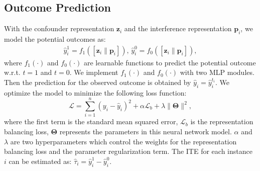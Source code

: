 \subsection{Outcome Prediction}
With the confounder representation $\mathbf{z}_i$ and the interference representation $\mathbf{p}_i$, we model the potential outcomes as:
\begin{align}
\hat{y}^1_i = f_1([\mathbf{z}_i \| \mathbf{p}_i]),\,\hat{y}^0_i = f_0([\mathbf{z}_i \| \mathbf{p}_i]),
\end{align}
where $f_1(\cdot)$ and $f_0(\cdot)$ are learnable functions to predict the potential outcome w.r.t. $t=1$ and $t=0$. We implement $f_1(\cdot)$ and $f_0(\cdot)$ with two MLP modules. Then the prediction for the observed outcome is obtained by $\hat{y}_i=\hat{y}^{t_i}_i$.
We optimize the model to minimize the following loss function: 
\begin{equation}
    \mathcal{L}=\sum_{i=1}^n (y_i-\hat{y}_i)^2 + \alpha\mathcal{L}_b + \lambda\|\mathbf{\Theta}\|^2,
\end{equation}
where the first term is the standard mean squared error, $\mathcal{L}_b$ is the representation balancing loss, $\mathbf{\Theta}$ represents the parameters in this neural network model. $\alpha$ and $\lambda$ are two hyperparameters which control the weights for the representation balancing loss and the parameter regularization term. The ITE for each instance $i$ can be estimated as: $\hat{\tau}_i=\hat{y}^1_i-\hat{y}^0_i$.

